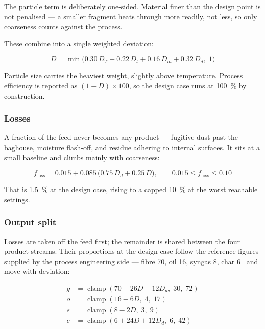 The particle term is deliberately one-sided. Material finer than the design point is not penalised --- a smaller fragment heats through more readily, not less, so only coarseness counts against the process.

These combine into a single weighted deviation:

\begin{equation}
  D = \min\bigl(0.30\,D_T + 0.22\,D_{t} + 0.16\,D_{\dot{m}} + 0.32\,D_{d},\; 1\bigr)
  \label{eq:D}
\end{equation}

Particle size carries the heaviest weight, slightly above temperature. Process efficiency is reported as $(1 - D) \times 100$, so the design case runs at \SI{100}{\%} by construction.

\subsubsection{Losses}

A fraction of the feed never becomes any product --- fugitive dust past the baghouse, moisture flash-off, and residue adhering to internal surfaces. It sits at a small baseline and climbs mainly with coarseness:

\begin{equation}
  f_{\text{loss}} = 0.015 + 0.085\,\bigl(0.75\,D_{d} + 0.25\,D\bigr),
  \qquad 0.015 \le f_{\text{loss}} \le 0.10
  \label{eq:loss}
\end{equation}

That is \SI{1.5}{\%} at the design case, rising to a capped \SI{10}{\%} at the worst reachable settings.

\subsubsection{Output split}

Losses are taken off the feed first; the remainder is shared between the four product streams. Their proportions at the design case follow the reference figures supplied by the process engineering side --- fibre 70, oil 16, syngas 8, char 6~\cite{akesson} and move with deviation:

\begin{align}
  g &= \operatorname{clamp}(70 - 26D - 12D_{d},\; 30,\; 72) \\
  o &= \operatorname{clamp}(16 - 6D,\; 4,\; 17) \\
  s &= \operatorname{clamp}(8 - 2D,\; 3,\; 9) \\
  c &= \operatorname{clamp}(6 + 24D + 12D_{d},\; 6,\; 42)
  \label{eq:props}
\end{align}

